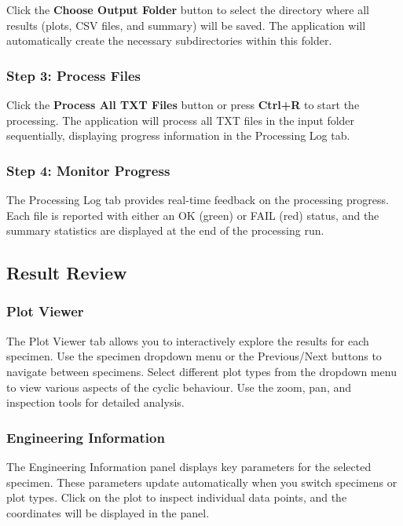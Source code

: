 \documentclass[11pt,a4paper]{article}
\begin{document}
Click the \textbf{Choose Output Folder} button to select the directory where all results (plots, CSV files, and summary) will be saved. The application will automatically create the necessary subdirectories within this folder.

\subsubsection{Step 3: Process Files}

Click the \textbf{Process All TXT Files} button or press \textbf{Ctrl+R} to start the processing. The application will process all TXT files in the input folder sequentially, displaying progress information in the Processing Log tab.

\subsubsection{Step 4: Monitor Progress}

The Processing Log tab provides real-time feedback on the processing progress. Each file is reported with either an OK (green) or FAIL (red) status, and the summary statistics are displayed at the end of the processing run.

\subsection{Result Review}

\subsubsection{Plot Viewer}

The Plot Viewer tab allows you to interactively explore the results for each specimen. Use the specimen dropdown menu or the Previous/Next buttons to navigate between specimens. Select different plot types from the dropdown menu to view various aspects of the cyclic behaviour. Use the zoom, pan, and inspection tools for detailed analysis.

\subsubsection{Engineering Information}

The Engineering Information panel displays key parameters for the selected specimen. These parameters update automatically when you switch specimens or plot types. Click on the plot to inspect individual data points, and the coordinates will be displayed in the panel.
\end{document}

